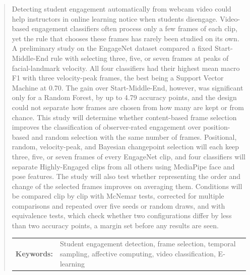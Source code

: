 \begin{abstract}
Detecting student engagement automatically from webcam video could help instructors in online learning notice when students disengage. Video-based engagement classifiers often process only a few frames of each clip, yet the rule that chooses these frames has rarely been studied on its own. A preliminary study on the EngageNet dataset compared a fixed Start-Middle-End rule with selecting three, five, or seven frames at peaks of facial-landmark velocity. All four classifiers had their highest mean macro F1 with three velocity-peak frames, the best being a Support Vector Machine at 0.70. The gain over Start-Middle-End, however, was significant only for a Random Forest, by up to 4.79 accuracy points, and the design could not separate how frames are chosen from how many are kept or from chance. This study will determine whether content-based frame selection improves the classification of observer-rated engagement over position-based and random selection with the same number of frames. Positional, random, velocity-peak, and Bayesian changepoint selection will each keep three, five, or seven frames of every EngageNet clip, and four classifiers will separate Highly-Engaged clips from all others using MediaPipe face and pose features. The study will also test whether representing the order and change of the selected frames improves on averaging them. Conditions will be compared clip by clip with McNemar tests, corrected for multiple comparisons and repeated over five seeds or random draws, and with equivalence tests, which check whether two configurations differ by less than two accuracy points, a margin set before any results are seen.

\begin{flushleft}
\begin{tabular}{lp{4.25in}}
\hspace{-0.5em}\textbf{Keywords:}\hspace{0.25em} & Student engagement detection, frame selection, temporal sampling, affective computing, video classification, E-learning \\
\end{tabular}
\end{flushleft}
\end{abstract}
